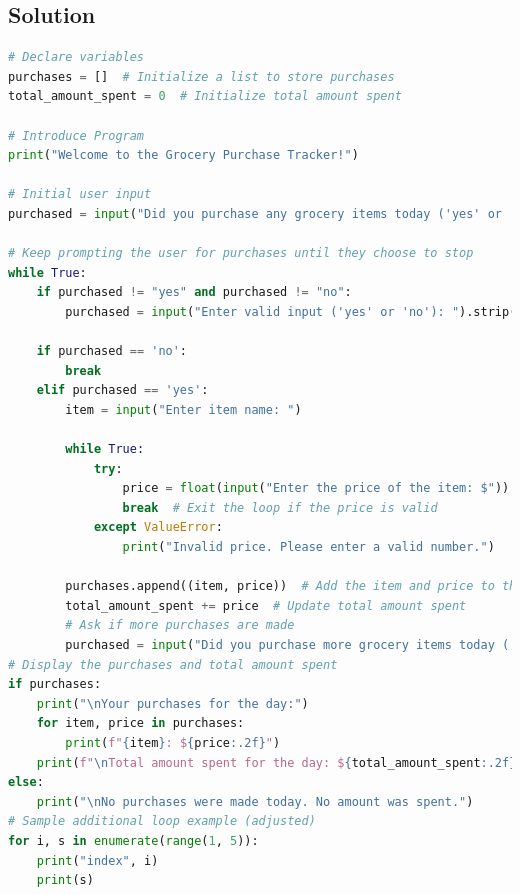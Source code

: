 \documentclass{article}
\begin{document}
\subsection*{Solution}
\begin{lstlisting}[language=python]
# Declare variables
purchases = []  # Initialize a list to store purchases
total_amount_spent = 0  # Initialize total amount spent

# Introduce Program
print("Welcome to the Grocery Purchase Tracker!")

# Initial user input
purchased = input("Did you purchase any grocery items today ('yes' or 'no'): ").strip().lower()

# Keep prompting the user for purchases until they choose to stop
while True:
    if purchased != "yes" and purchased != "no":
        purchased = input("Enter valid input ('yes' or 'no'): ").strip().lower()
    
    if purchased == 'no':
        break
    elif purchased == 'yes':
        item = input("Enter item name: ")
        
        while True:
            try:
                price = float(input("Enter the price of the item: $"))
                break  # Exit the loop if the price is valid
            except ValueError:
                print("Invalid price. Please enter a valid number.")
        
        purchases.append((item, price))  # Add the item and price to the list of purchases
        total_amount_spent += price  # Update total amount spent
        # Ask if more purchases are made
        purchased = input("Did you purchase more grocery items today ('yes' or 'no'): ").strip().lower()
# Display the purchases and total amount spent
if purchases:
    print("\nYour purchases for the day:")
    for item, price in purchases:
        print(f"{item}: ${price:.2f}")
    print(f"\nTotal amount spent for the day: ${total_amount_spent:.2f}")
else:
    print("\nNo purchases were made today. No amount was spent.")
# Sample additional loop example (adjusted)
for i, s in enumerate(range(1, 5)):
    print("index", i)
    print(s)
    
\end{lstlisting}
\end{document}
